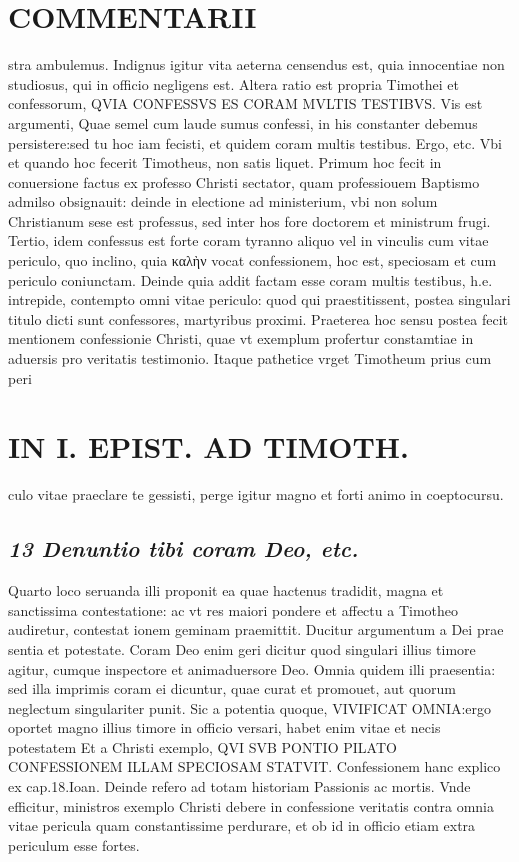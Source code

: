 \documentclass{article}
\begin{document}
\begin{pages}
\section*{COMMENTARII }
\marginpar{[ p.162 ]}\pstart stra ambulemus. Indignus igitur vita aeterna censendus est, quia innocentiae non studiosus, qui in officio negligens est.  \pend\pstart Altera ratio est propria Timothei et confessorum, QVIA CONFESSVS ES CORAM MVLTIS TESTIBVS. Vis est argumenti, Quae semel cum laude sumus confessi, in his constanter debemus persistere:sed tu hoc iam fecisti, et quidem coram multis testibus. Ergo, etc. Vbi et quando hoc fecerit Timotheus, non satis liquet. Primum hoc fecit in conuersione factus ex professo Christi sectator, quam professiouem Baptismo admilso obsignauit: deinde in electione ad ministerium, vbi non solum Christianum sese est professus, sed inter hos fore doctorem et ministrum frugi. Tertio, idem confessus est forte coram tyranno aliquo vel in vinculis cum vitae periculo, quo inclino, quia καλὴν vocat confessionem, hoc est, speciosam et cum periculo coniunctam. Deinde quia addit factam esse coram multis testibus, h.e. intrepide, contempto omni vitae periculo: quod qui praestitissent, postea singulari titulo dicti sunt confessores, martyribus proximi. Praeterea hoc sensu postea fecit mentionem confessionie Christi, quae vt exemplum profertur constamtiae in aduersis pro veritatis testimonio. Itaque pathetice vrget Timotheum prius cum peri\pend
\section*{IN I. EPIST. AD TIMOTH. }
\marginpar{[ p.163 ]}\pstart culo vitae praeclare te gessisti, perge igitur magno et forti animo in coeptocursu.  \pend
{}
{}
\subsection*{\textit{13 Denuntio tibi coram Deo, etc. }}\pstart Quarto loco seruanda illi proponit ea quae hactenus tradidit, magna et sanctissima contestatione: ac vt res maiori pondere et affectu a Timotheo audiretur, contestat ionem geminam praemittit. Ducitur argumentum a Dei prae sentia et potestate.  \pend\pstart Coram Deo enim geri dicitur quod singulari illius timore agitur, cumque inspectore et animaduersore Deo. Omnia quidem illi praesentia: sed illa imprimis coram ei dicuntur, quae curat et promouet, aut quorum neglectum singulariter punit. Sic a potentia quoque, VIVIFICAT OMNIA:ergo oportet magno illius timore in officio versari, habet enim vitae et necis potestatem Et a Christi exemplo, QVI SVB PONTIO PILATO CONFESSIONEM ILLAM SPECIOSAM STATVIT. Confessionem hanc explico ex cap.18.Ioan. Deinde refero ad totam historiam Passionis ac mortis. Vnde efficitur, ministros exemplo Christi debere in confessione veritatis contra omnia vitae pericula quam constantissime perdurare, et ob id in officio etiam extra periculum esse fortes.  \pend
{}
{}

\end{pages}
\end{document}
